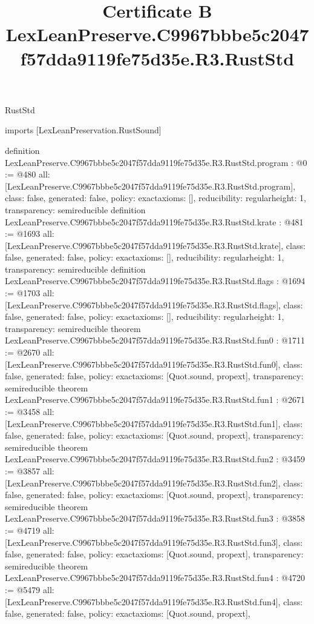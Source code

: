 \begin{lexlean}{RustStd}
\title{Certificate B LexLeanPreserve.C9967bbbe5c2047f57dda9119fe75d35e.R3.RustStd}
\begin{coremodule}
imports [LexLeanPreservation.RustSound]

definition LexLeanPreserve.C9967bbbe5c2047f57dda9119fe75d35e.R3.RustStd.program : @0 := @480 {
  all: [LexLeanPreserve.C9967bbbe5c2047f57dda9119fe75d35e.R3.RustStd.program],
  class: false,
  generated: false,
  policy: exact{axioms: []},
  reducibility: regular{height: 1},
  transparency: semireducible
}
definition LexLeanPreserve.C9967bbbe5c2047f57dda9119fe75d35e.R3.RustStd.krate : @481 := @1693 {
  all: [LexLeanPreserve.C9967bbbe5c2047f57dda9119fe75d35e.R3.RustStd.krate],
  class: false,
  generated: false,
  policy: exact{axioms: []},
  reducibility: regular{height: 1},
  transparency: semireducible
}
definition LexLeanPreserve.C9967bbbe5c2047f57dda9119fe75d35e.R3.RustStd.flags : @1694 := @1703 {
  all: [LexLeanPreserve.C9967bbbe5c2047f57dda9119fe75d35e.R3.RustStd.flags],
  class: false,
  generated: false,
  policy: exact{axioms: []},
  reducibility: regular{height: 1},
  transparency: semireducible
}
theorem LexLeanPreserve.C9967bbbe5c2047f57dda9119fe75d35e.R3.RustStd.fun0 : @1711 := @2670 {
  all: [LexLeanPreserve.C9967bbbe5c2047f57dda9119fe75d35e.R3.RustStd.fun0],
  class: false,
  generated: false,
  policy: exact{axioms: [Quot.sound, propext]},
  transparency: semireducible
}
theorem LexLeanPreserve.C9967bbbe5c2047f57dda9119fe75d35e.R3.RustStd.fun1 : @2671 := @3458 {
  all: [LexLeanPreserve.C9967bbbe5c2047f57dda9119fe75d35e.R3.RustStd.fun1],
  class: false,
  generated: false,
  policy: exact{axioms: [Quot.sound, propext]},
  transparency: semireducible
}
theorem LexLeanPreserve.C9967bbbe5c2047f57dda9119fe75d35e.R3.RustStd.fun2 : @3459 := @3857 {
  all: [LexLeanPreserve.C9967bbbe5c2047f57dda9119fe75d35e.R3.RustStd.fun2],
  class: false,
  generated: false,
  policy: exact{axioms: [Quot.sound, propext]},
  transparency: semireducible
}
theorem LexLeanPreserve.C9967bbbe5c2047f57dda9119fe75d35e.R3.RustStd.fun3 : @3858 := @4719 {
  all: [LexLeanPreserve.C9967bbbe5c2047f57dda9119fe75d35e.R3.RustStd.fun3],
  class: false,
  generated: false,
  policy: exact{axioms: [Quot.sound, propext]},
  transparency: semireducible
}
theorem LexLeanPreserve.C9967bbbe5c2047f57dda9119fe75d35e.R3.RustStd.fun4 : @4720 := @5479 {
  all: [LexLeanPreserve.C9967bbbe5c2047f57dda9119fe75d35e.R3.RustStd.fun4],
  class: false,
  generated: false,
  policy: exact{axioms: [Quot.sound, propext]},
}
\end{coremodule}
\end{lexlean}
